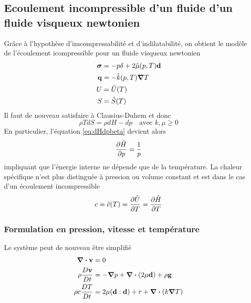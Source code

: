 \documentclass[a4paper,11pt]{report}
\newcommand{\bs}[1]{\boldsymbol{#1}}
\newcommand{\dvm}[2]{\frac{D #1}{D #2}}
\newcommand{\recip}[1]{\frac{1}{#1}}
\begin{document}
    \subsection{Ecoulement incompressible d'un fluide d'un fluide visqueux newtonien}
      Grâce à l'hypothèse d'imcompressabilité et d'indilatabilité, on obtient le modèle de l'écoulement icompressible pour un fluide visqueux newtonien
      \begin{equation}
        \begin{aligned}
          \bs{\sigma} &= -p \delta + 2 \hat{\mu}(p, T) \vb{d}\\
          \vb{q} &= -\hat{k}(p, T) \grad T\\
          U &= \hat{U}(T)\\
          S &= \hat{S}(T)
        \end{aligned}
      \end{equation}
      Il faut de nouveau satisfaire à Clausius-Duhem et donc
      \begin{equation}
        \rho T dS = \rho dH -dp \quad \textrm{avec } k,\mu \geq 0
      \end{equation}
      En particulier, l'équation \ref{eq:dHdpbeta} devient alors
      \begin{equation}
        \pdv{\hat{H}}{p} = \recip{p}
      \end{equation}
      impliquant que l'énergie interne ne dépende que de la température. La chaleur spécifique n'est plus distinguée à pression ou volume constant et est dans le cas d'un écoulement incompressible
      \begin{equation}
        c = \hat{c}(T) = \pdv{\hat{U}}{T} = \pdv{\hat{H}}{T}
      \end{equation}

      \subsubsection{Formulation en pression, vitesse et température}
        Le système peut de nouveau être simplifié
        \begin{equation}
          \begin{aligned}
            \div \vb{v} &= 0 \\
            \rho \dvm{\vb{v}}{t} &= - \grad p + \div (2 \mu \vb{d}) + \rho \vb{g}\\
            \rho c \dvm{T}{t} &= 2 \mu (\vb{d}:\vb{d}) + r + \div (k \grad T)
          \end{aligned}
        \end{equation}
\end{document}
